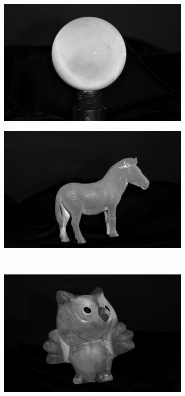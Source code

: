 \documentclass{paper}
\begin{document}
\begin{figure}[h!]
        ~ 
        \begin{subfigure}{0.3\textwidth}
                \includegraphics[width=\textwidth]{report_fig/gray_a}
        \end{subfigure}
        \begin{subfigure}{0.3\textwidth}
                \includegraphics[width=\textwidth]{report_fig/horse_a}
        \end{subfigure}
        ~ 
        \begin{subfigure}{0.3\textwidth}
                \includegraphics[width=\textwidth]{report_fig/owl_a}

\end{subfigure}
\end{figure}
\end{document}
